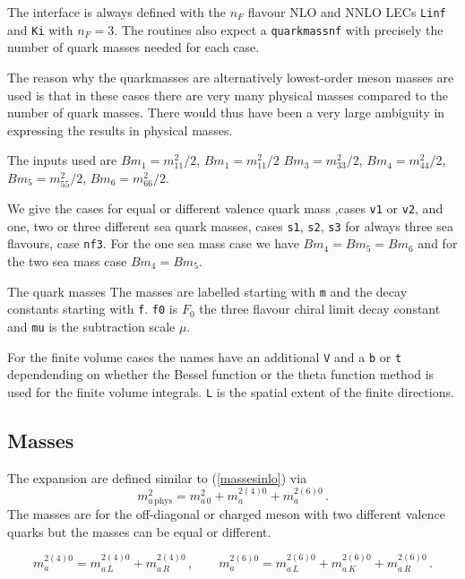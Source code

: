 \documentclass[12pt,a4paper]{article}
\newcommand{\mytt}[1]{\texttt{#1}}
\newcommand{\newfunction}[1]{\mytt{#1}\index{\mytt{#1}}}
\begin{document}
The interface is always defined with the $n_F$ flavour NLO and NNLO LECs
\newfunction{Linf} and \newfunction{Ki} with $n_F=3$. The routines also
expect a \newfunction{quarkmassnf} with precisely the number of quark masses
needed for each case.

The reason why the quarkmasses are alternatively lowest-order meson masses
are used is that in these cases there are very many physical masses
compared to the number of quark masses. There would thus have been a very
large ambiguity in expressing the results in physical masses.

The inputs used are $Bm_1=m_{11}^2/2$, $Bm_1=m_{11}^2/2$
$Bm_3=m_{33}^2/2$, $Bm_4=m_{44}^2/2$, $Bm_5=m_{55}^2/2$,  $Bm_6=m_{66}^2/2$.

We give the cases for equal or different valence quark mass ,cases \mytt{v1}
or \mytt{v2}, and one, two or three different sea quark masses,
cases \mytt{s1}, \mytt{s2}, \mytt{s3} for always three sea flavours, case \mytt{nf3}. For the one sea mass case we have $Bm_4=Bm_5=Bm_6$ and for the two sea
mass case $Bm_4=Bm_5$.

The quark masses 
The masses are labelled starting with \mytt{m} and the decay constants starting with \mytt{f}. \mytt{f0} is $F_0$ the three flavour chiral limit decay constant
and \mytt{mu} is the subtraction scale $\mu$.

For the finite volume cases the names have an additional \mytt{V}
and a \mytt{b} or \mytt{t} dependending on whether the Bessel
function or the theta function method is used for the finite volume
integrals. \mytt{L} is the spatial extent of the finite directions.

\subsection{Masses}

The expansion are defined similar to (\ref{massesinlo}) via
\begin{equation}
\label{massesPQnf3}
m_{a\,\mathrm{phys}}^2 = m_{a\,0}^2+m_a^{2(4)0}+m_a^{2(6)0}\,.
\end{equation}
The masses are for the off-diagonal or charged meson with two different
valence quarks but the masses can be
equal or different.

\begin{equation}
\label{defmassesPQlo}
m_a^{2(4)0}=m_{a\,L}^{2(4)0}+m_{a\,R}^{2(4)0}\,,
\qquad
m_a^{2(6)0}=m_{a\,L}^{2(6)0}+m_{a\,K}^{2(6)0}+m_{a\,R}^{2(6)0}\,.
\end{equation}
\\
\end{document}
